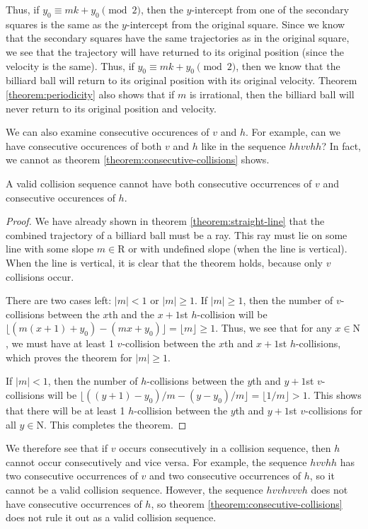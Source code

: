 Thus, if $y_0 \equiv mk + y_0 \pmod{2}$, then the $y$-intercept from one of the secondary squares is the same as the $y$-intercept from the original square. Since we know that the secondary squares have the same trajectories as in the original square, we see that the trajectory will have returned to its original position (since the velocity is the same). Thus, if $y_0 \equiv mk + y_0 \pmod{2}$, then we know that the billiard ball will return to its original position with its original velocity. Theorem \ref{theorem:periodicity} also shows that if $m$ is irrational, then the billiard ball will never return to its original position and velocity.

We can also examine consecutive occurences of $v$ and $h$. For example, can we have consecutive occurences of both $v$ and $h$ like in the sequence $hhvvhh$? In fact, we cannot as theorem \ref{theorem:consecutive-collisions} shows.

\begin{theorem}
  \label{theorem:consecutive-collisions}
  A valid collision sequence cannot have both consecutive occurrences of $v$ and consecutive occurences of $h$.
\end{theorem}
\begin{proof}
  We have already shown in theorem \ref{theorem:straight-line} that the combined trajectory of a billiard ball must be a ray. This ray must lie on some line with some slope $m \in \mathrm{R}$ or with undefined slope (when the line is vertical). When the line is vertical, it is clear that the theorem holds, because only $v$ collisions occur. 

  There are two cases left: $|m| < 1$ or $|m| \geq 1$. If $|m| \geq 1$, then the number of $v$-collisions between the $x$th and the $x+1$st $h$-collision will be $\lfloor (m(x+1) + y_0) - (mx + y_0) \rfloor = \lfloor m \rfloor \geq 1$. Thus, we see that for any $x \in \mathrm{N}$, we must have at least 1 $v$-collision between the $x$th and $x+1$st $h$-collisions, which proves the theorem for $|m| \geq 1$.

  If $|m| < 1$, then the number of $h$-collisions between the $y$th and $y+1$st $v$-collisions will be $\lfloor ((y + 1) - y_0)/m - (y - y_0)/m \rfloor = \lfloor 1/m \rfloor > 1$. This shows that there will be at least 1 $h$-collision between the $y$th and $y+1$st $v$-collisions for all $y \in \mathrm{N}$. This completes the theorem.
\end{proof}

We therefore see that if $v$ occurs consecutively in a collision sequence, then $h$ cannot occur consecutively and vice versa. For example, the sequence $hvvhh$ has two consecutive occurrences of $v$ and two consecutive occurrences of $h$, so it cannot be a valid collision sequence. However, the sequence $hvvhvvvh$ does not have consecutive occurrences of $h$, so theorem \ref{theorem:consecutive-collisions} does not rule it out as a valid collision sequence.

